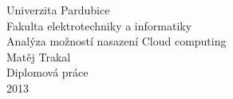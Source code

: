 
\renewcommand{\baselinestretch}{1} %
\begin{center}

\Large\sc
Univerzita Pardubice\\
Fakulta elektrotechniky a informatiky\\[70mm]


\Huge\sc
Analýza možností nasazení Cloud computing\\[20mm]

Matěj Trakal\\[55mm]


\Large\sc
Diplomová práce\\
2013\\
\end{center}
\normalsize %
\newpage